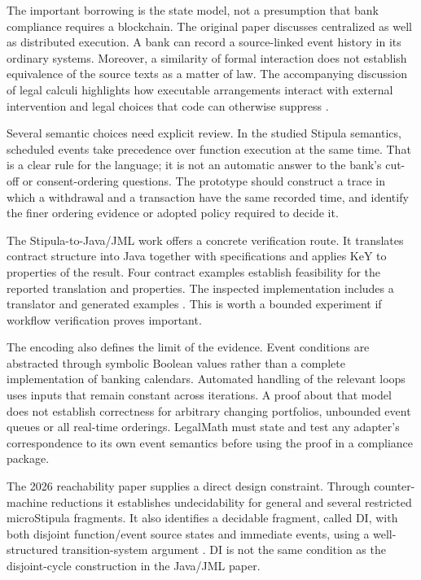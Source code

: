 The important borrowing is the state model, not a presumption that bank compliance
requires a blockchain. The original paper discusses centralized as well as
distributed execution. A bank can record a source-linked event history in its
ordinary systems. Moreover, a similarity of formal interaction does not establish
equivalence of the source texts as a matter of law. The accompanying discussion
of legal calculi highlights how executable arrangements interact with external
intervention and legal choices that code can otherwise suppress
\citep{stipula2021,crafa2022}.

Several semantic choices need explicit review. In the studied Stipula semantics,
scheduled events take precedence over function execution at the same time. That
is a clear rule for the language; it is not an automatic answer to the bank's
cut-off or consent-ordering questions. The prototype should construct a trace in
which a withdrawal and a transaction have the same recorded time, and identify
the finer ordering evidence or adopted policy required to decide it.

The Stipula-to-Java/JML work offers a concrete verification route. It translates
contract structure into Java together with specifications and applies KeY to
properties of the result. Four contract examples establish feasibility for the
reported translation and properties. The inspected implementation includes a
translator and generated examples \citep[secs.~3--4 and apps.~A--B]{stipulakey2025,stipulakeycode}.
This is worth a bounded experiment if workflow verification proves important.

The encoding also defines the limit of the evidence. Event conditions are
abstracted through symbolic Boolean values rather than a complete implementation
of banking calendars. Automated handling of the relevant loops uses inputs that
remain constant across iterations. A proof about that model does not establish
correctness for arbitrary changing portfolios, unbounded event queues or all
real-time orderings. LegalMath must state and test any adapter's correspondence
to its own event semantics before using the proof in a compliance package.

The 2026 reachability paper supplies a direct design constraint. Through
counter-machine reductions it establishes undecidability for general and several
restricted microStipula fragments. It also identifies a decidable fragment,
called DI, with both disjoint function/event source states and immediate events,
using a well-structured transition-system argument
\citep[secs.~2--4]{reachability2026}. DI is not the same condition as the
disjoint-cycle construction in the Java/JML paper.

